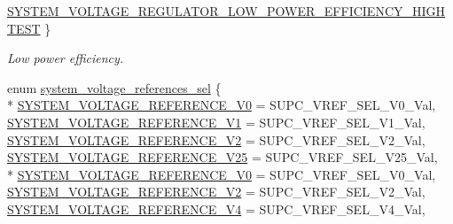\begin{DoxyCompactItemize}
\hyperlink{group__asfdoc__sam0__system__group_gga07175f24498545cf119e3d514f13e2e7a15dd296506e48391c460e19ec6cd782b}{S\+Y\+S\+T\+E\+M\+\_\+\+V\+O\+L\+T\+A\+G\+E\+\_\+\+R\+E\+G\+U\+L\+A\+T\+O\+R\+\_\+\+L\+O\+W\+\_\+\+P\+O\+W\+E\+R\+\_\+\+E\+F\+F\+I\+C\+I\+E\+N\+C\+Y\+\_\+\+H\+I\+G\+H\+T\+E\+S\+T}
 \}
\begin{DoxyCompactList}\small\item\em Low power efficiency. \end{DoxyCompactList}\item 
enum \hyperlink{group__asfdoc__sam0__system__group_ga05cd664c0c675f440e25980147d01f15}{system\+\_\+voltage\+\_\+references\+\_\+sel} \{ \\*
\hyperlink{group__asfdoc__sam0__system__group_gga05cd664c0c675f440e25980147d01f15a1e21094a8b6dc3b6736cf41d49f530d2}{S\+Y\+S\+T\+E\+M\+\_\+\+V\+O\+L\+T\+A\+G\+E\+\_\+\+R\+E\+F\+E\+R\+E\+N\+C\+E\+\_\+V0} = S\+U\+P\+C\+\_\+\+V\+R\+E\+F\+\_\+\+S\+E\+L\+\_\+V0\+\_\+\+Val, 
\hyperlink{group__asfdoc__sam0__system__group_gga05cd664c0c675f440e25980147d01f15a71b922baf8ccc6a48f5539f256f90524}{S\+Y\+S\+T\+E\+M\+\_\+\+V\+O\+L\+T\+A\+G\+E\+\_\+\+R\+E\+F\+E\+R\+E\+N\+C\+E\+\_\+V1} = S\+U\+P\+C\+\_\+\+V\+R\+E\+F\+\_\+\+S\+E\+L\+\_\+V1\+\_\+\+Val, 
\hyperlink{group__asfdoc__sam0__system__group_gga05cd664c0c675f440e25980147d01f15af9148c9356e4b89f8495cd02b63558f3}{S\+Y\+S\+T\+E\+M\+\_\+\+V\+O\+L\+T\+A\+G\+E\+\_\+\+R\+E\+F\+E\+R\+E\+N\+C\+E\+\_\+V2} = S\+U\+P\+C\+\_\+\+V\+R\+E\+F\+\_\+\+S\+E\+L\+\_\+V2\+\_\+\+Val, 
\hyperlink{group__asfdoc__sam0__system__group_gga05cd664c0c675f440e25980147d01f15ad836b46f9503e9d134e0cc6cebcb013e}{S\+Y\+S\+T\+E\+M\+\_\+\+V\+O\+L\+T\+A\+G\+E\+\_\+\+R\+E\+F\+E\+R\+E\+N\+C\+E\+\_\+V25} = S\+U\+P\+C\+\_\+\+V\+R\+E\+F\+\_\+\+S\+E\+L\+\_\+V25\+\_\+\+Val, 
\\*
\hyperlink{group__asfdoc__sam0__system__group_gga05cd664c0c675f440e25980147d01f15a324b9f9e049ccdd46a68efa4dd487898}{S\+Y\+S\+T\+E\+M\+\_\+\+V\+O\+L\+T\+A\+G\+E\+\_\+\+R\+E\+F\+E\+R\+E\+N\+C\+E\+\_\+V0} = S\+U\+P\+C\+\_\+\+V\+R\+E\+F\+\_\+\+S\+E\+L\+\_\+V0\+\_\+\+Val, 
\hyperlink{group__asfdoc__sam0__system__group_gga05cd664c0c675f440e25980147d01f15a3221e830a3effa8556c2bae3ce6daa6c}{S\+Y\+S\+T\+E\+M\+\_\+\+V\+O\+L\+T\+A\+G\+E\+\_\+\+R\+E\+F\+E\+R\+E\+N\+C\+E\+\_\+V2} = S\+U\+P\+C\+\_\+\+V\+R\+E\+F\+\_\+\+S\+E\+L\+\_\+V2\+\_\+\+Val, 
\hyperlink{group__asfdoc__sam0__system__group_gga05cd664c0c675f440e25980147d01f15a5044713c58324b60a7099a0982b6aee4}{S\+Y\+S\+T\+E\+M\+\_\+\+V\+O\+L\+T\+A\+G\+E\+\_\+\+R\+E\+F\+E\+R\+E\+N\+C\+E\+\_\+V4} = S\+U\+P\+C\+\_\+\+V\+R\+E\+F\+\_\+\+S\+E\+L\+\_\+V4\+\_\+\+Val, 

\end{DoxyCompactItemize}
